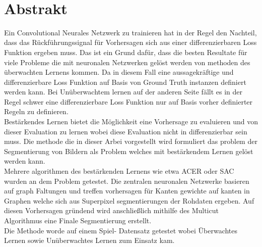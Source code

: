 ~\label{sec:ref}
\section*{Abstrakt}
Ein Convolutional Neurales Netzwerk zu trainieren hat in der Regel den Nachteil, dass das Rückführungssignal für Vorhersagen sich aus einer differenzierbaren Loss Funktion ergeben muss. Das ist ein Grund dafür, dass die besten Resultate für viele Probleme die mit neuronalen Netzwerken gelöst werden von methoden des überwachten Lernens kommen. Da in diesem Fall eine aussagekräftige und differenzierbare Loss Funktion auf Basis von Ground Truth instanzen definiert werden kann. Bei Unüberwachtem lernen auf der anderen Seite fällt es in der Regel schwer eine differenzierbare Loss Funktion nur auf Basis vorher definierter Regeln zu definieren.\\
Bestärkendes Lernen bietet die Möglichkeit eine Vorhersage zu evaluieren und von dieser Evaluation zu lernen wobei diese Evaluation nicht in differenzierbar sein muss. Die methode die in dieser Arbei vorgestellt wird formuliert das problem der Segmentierung von Bildern als Problem welches mit bestärkendem Lernen gelöst werden kann.\\
Mehrere algorithmen des bestärkenden Lernens wie etwa ACER oder SAC wurden an dem Problem getestet. Die zentralen neuronalen Netzwerke basieren auf graph Faltungen und treffen vorhersagen für Kanten gewichte auf kanten in Graphen welche sich aus Superpixel segmentierungen der Rohdaten ergeben. Auf diesen Vorhersagen gründend wird anschließlich mithilfe des Multicut Algorithmus eine Finale Segmentierung erstellt.\\
Die Methode worde auf einem Spiel- Datensatz getestet wobei Überwachtes Lernen sowie Unüberwachtes Lernen zum Einsatz kam.
